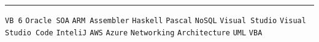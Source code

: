 \documentclass[12pt]{developercv} %
\begin{document}

\vspace{\baselineskip}
\hrule
\vspace{\baselineskip}


\begin{minipage}[t]{0.7\textwidth}
	\vspace{-\baselineskip} %

	

	\texttt{VB 6}\slashsep
	\texttt{Oracle SOA}\slashsep
	\texttt{ARM Assembler}\slashsep
	\texttt{Haskell}\slashsep
	\texttt{Pascal}\slashsep
	\texttt{NoSQL}\slashsep
	\texttt{Visual Studio}\slashsep
	\texttt{Visual Studio Code}\slashsep
	\texttt{InteliJ}\slashsep
	\texttt{AWS}\slashsep
	\texttt{Azure}\slashsep
	\texttt{Networking}\slashsep
	\texttt{Architecture}\slashsep
	\texttt{UML}\slashsep
	\texttt{VBA}

\end{minipage}
\hfill
\begin{minipage}[t]{0.25\textwidth}
	\vspace{-\baselineskip} %
	\\
	\\

	
\end{minipage}



\pagebreak


\centering{}
\vspace{\baselineskip}
\end{document}
